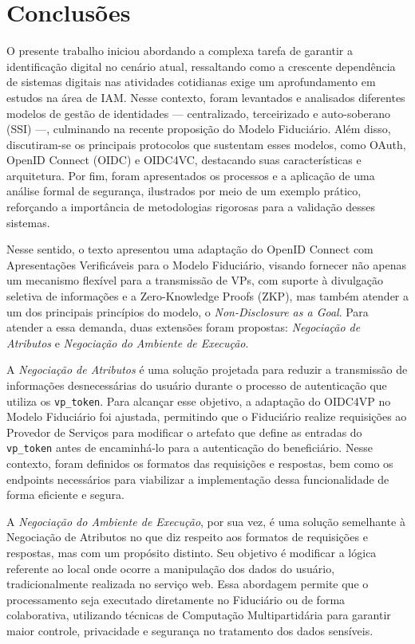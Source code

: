 \newpage
\section{Conclusões} \label{section:conclusion}

O presente trabalho iniciou abordando a complexa tarefa de garantir a identificação digital no cenário atual, ressaltando como a crescente dependência de sistemas digitais nas atividades cotidianas exige um aprofundamento em estudos na área de IAM. Nesse contexto, foram levantados e analisados diferentes modelos de gestão de identidades — centralizado, terceirizado e auto-soberano (SSI) —, culminando na recente proposição do Modelo Fiduciário. Além disso, discutiram-se os principais protocolos que sustentam esses modelos, como OAuth, OpenID Connect (OIDC) e OIDC4VC, destacando suas características e arquitetura. Por fim, foram apresentados os processos e a aplicação de uma análise formal de segurança, ilustrados por meio de um exemplo prático, reforçando a importância de metodologias rigorosas para a validação desses sistemas.

Nesse sentido, o texto apresentou uma adaptação do OpenID Connect com Apresentações Verificáveis para o Modelo Fiduciário, visando fornecer não apenas um mecanismo flexível para a transmissão de VPs, com suporte à divulgação seletiva de informações e a Zero-Knowledge Proofs (ZKP), mas também atender a um dos principais princípios do modelo, o \emph{Non-Disclosure as a Goal}. Para atender a essa demanda, duas extensões foram propostas: \emph{Negociação de Atributos} e \emph{Negociação do Ambiente de Execução}.

A \emph{Negociação de Atributos} é uma solução projetada para reduzir a transmissão de informações desnecessárias do usuário durante o processo de autenticação que utiliza os \texttt{vp\_token}. Para alcançar esse objetivo, a adaptação do OIDC4VP no Modelo Fiduciário foi ajustada, permitindo que o Fiduciário realize requisições ao Provedor de Serviços para modificar o artefato que define as entradas do \texttt{vp\_token} antes de encaminhá-lo para a autenticação do beneficiário. Nesse contexto, foram definidos os formatos das requisições e respostas, bem como os endpoints necessários para viabilizar a implementação dessa funcionalidade de forma eficiente e segura.

A \emph{Negociação do Ambiente de Execução}, por sua vez, é uma solução semelhante à Negociação de Atributos no que diz respeito aos formatos de requisições e respostas, mas com um propósito distinto. Seu objetivo é modificar a lógica referente ao local onde ocorre a manipulação dos dados do usuário, tradicionalmente realizada no serviço web. Essa abordagem permite que o processamento seja executado diretamente no Fiduciário ou de forma colaborativa, utilizando técnicas de Computação Multipartidária para garantir maior controle, privacidade e segurança no tratamento dos dados sensíveis.


